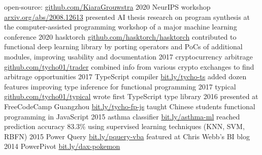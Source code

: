 \documentclass[]{friggeri-cv}
\begin{document}
\begin{entrylist}
\entry
    {}
    {open-source: }
    {\href{https://www.github.com/KiaraGrouwstra}{github.com/KiaraGrouwstra}}
    {}
   \entry
     {2020}
     {NeurIPS workshop}
     {\href{https://arxiv.org/abs/2008.12613}{arxiv.org/abs/2008.12613}}
     {
         presented AI thesis research on program synthesis at the computer-assisted programming workshop of a major machine learning conference
     }
  \entry
    {2020}
    {hasktorch}
    {\href{https://github.com/hasktorch/hasktorch}{github.com/hasktorch/hasktorch}}
    {
      contributed to functional deep learning library by porting operators and PoCs of additional modules, improving usability and documentation
    }
  \entry
    {2017}
    {cryptocurrency arbitrage}
    {\href{https://github.com/KiaraGrouwstra/trader}{github.com/tycho01/trader}}
    {
      combined info from various crypto exchanges to find arbitrage opportunities
    }
  \entry
    {2017}
    {TypeScript compiler}
    {\href{https://github.com/Microsoft/TypeScript/pulls/KiaraGrouwstra}{bit.ly/tycho-ts}}
    {
      added dozen features improving type inference for functional programming
    }
  \entry
    {2017}
    {typical}
    {\href{https://github.com/KiaraGrouwstra/typical}{github.com/tycho01/typical}}
    {
      wrote first TypeScript type library
    }
  \entry
    {2016}
    {%
presented at
      FreeCodeCamp Guangzhou
    }
    {\href{https://www.slideshare.net/TychoGrouwstra/fp-in-js}{bit.ly/tycho-fp-js}}
    {taught Chinese students functional programming in JavaScript}
  \entry
    {2015}
    {%
asthma
      classifier
      \normalfont{}
    }
    {\href{http://bit.ly/asthma-ml}{bit.ly/asthma-ml}}
    {
      reached prediction accuracy 83.3\% using supervised learning techniques (KNN, SVM, RBFN)
    }
  \entry
    {2015}
    {%
Power Query 
    }
    {\href{https://blog.crossjoin.co.uk/2015/06/10/power-queryexcel-2016-vba-examples/}{bit.ly/pquery-vba}}
    {
      featured at
      Chris Webb's BI blog
    }
  \entry
    {2014}
    {%
PowerPivot 
    }
    {\href{https://powerpivotpro.com/2014/02/optimal-set-selection-power-pivot-does-pokemon-and-my-brain-just-exploded/}{bit.ly/dax-pokemon}}

\end{entrylist}
\end{document}
